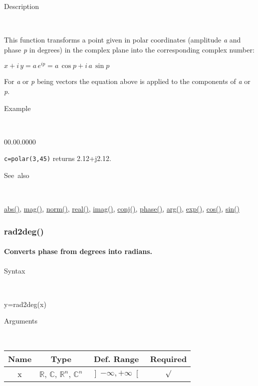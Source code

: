 \begin{description}
\item [Description]~
\end{description}
This function transforms a point given in polar coordinates (amplitude
\textit{a} and phase \textit{p} in degrees) in the complex plane into
the corresponding complex number:

\medskip{}
$x+i\, y=a\, e^{ip}=a\,\cos p+i\, a\,\sin p$
\medskip{}

For \textit{a} or \textit{p} being vectors the equation
above is applied to the components of \textit{a} or \textit{p}.

\begin{description}
\item [Example]~
\end{description}
\begin{lyxlist}{00.00.0000}
\item [\texttt{c=polar(3,45)}]returns 2.12+j2.12.
\end{lyxlist}
\begin{description}
\item [See~also]~
\end{description}
\textcolor{blue}{\hyperlink{abs}{abs()}}, \textcolor{blue}{\hyperlink{mag}{mag()}},
\textcolor{blue}{\hyperlink{norm}{norm()}}, \textcolor{blue}{\hyperlink{real}{real()}},
\textcolor{blue}{\hyperlink{imag}{imag()}}, \textcolor{blue}{\hyperlink{conj}{conj()}},
\textcolor{blue}{\hyperlink{phase}{phase()}}, \textcolor{blue}{\hyperlink{arg}{arg()}},
\textcolor{blue}{\hyperlink{exp}{exp()}}, \textcolor{blue}{\hyperlink{cos}{cos()}},
\textcolor{blue}{\hyperlink{sin}{sin()}}


\newpage
\subsubsection*{\hypertarget{rad2deg}{}{\Large rad2deg()}}


\paragraph{\label{par:rad2deg}Converts phase from degrees into radians.}

\begin{description}
\item [Syntax]~
\end{description}
y=rad2deg(x)

\begin{description}
\item [Arguments]~
\end{description}
\begin{tabular}{|c|c|c|c|}
\hline 
Name&
Type&
Def. Range&
Required\tabularnewline
\hline
\hline 
x&
$\mathbb{R}$, $\mathbb{C}$, $\mathbb{R}^{n}$, $\mathbb{C}^{n}$ &
$\left]-\infty,+\infty\right[$&
$\surd$\tabularnewline
\hline
\end{tabular}

